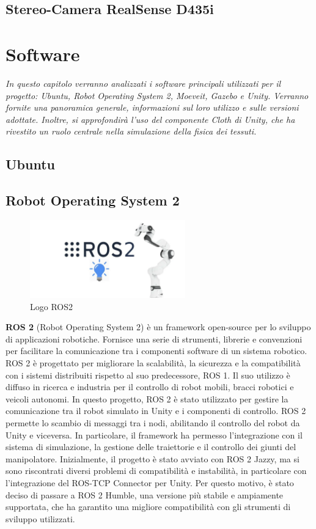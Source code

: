 \documentclass[11pt]{report}
\begin{document}
\subsection{Stereo-Camera RealSense D435i}

\section{Software}
\textit{In questo capitolo verranno analizzati i software principali utilizzati per il progetto: Ubuntu, Robot Operating System 2, Moeveit, Gazebo e Unity. Verranno fornite una panoramica generale, informazioni sul loro utilizzo e sulle versioni adottate. Inoltre, si approfondirà l'uso del componente Cloth di Unity, che ha rivestito un ruolo centrale nella simulazione della fisica dei tessuti.}

\subsection{Ubuntu}

\subsection{Robot Operating System 2}

\begin{figure}[H]
    \centering
    \includegraphics[width=0.6\textwidth]{images/ROS2.png}
    \caption{Logo ROS2}
    \label{fig:ROS2}
\end{figure}

\textbf{ROS 2} (Robot Operating System 2) \cite{ROS2} è un framework open-source per lo sviluppo di applicazioni robotiche. Fornisce una serie di strumenti, librerie e convenzioni per facilitare la comunicazione tra i componenti software di un sistema robotico. ROS 2 è progettato per migliorare la scalabilità, la sicurezza e la compatibilità con i sistemi distribuiti rispetto al suo predecessore, ROS 1. Il suo utilizzo è diffuso in ricerca e industria per il controllo di robot mobili, bracci robotici e veicoli autonomi.
In questo progetto, ROS 2 è stato utilizzato per gestire la comunicazione tra il robot simulato in Unity e i componenti di controllo. ROS 2 permette lo scambio di messaggi tra i nodi, abilitando il controllo del robot da Unity e viceversa. In particolare, il framework ha permesso l'integrazione con il sistema di simulazione, la gestione delle traiettorie e il controllo dei giunti del manipolatore.
Inizialmente, il progetto è stato avviato con ROS 2 Jazzy, ma si sono riscontrati diversi problemi di compatibilità e instabilità, in particolare con l'integrazione del ROS-TCP Connector per Unity. Per questo motivo, è stato deciso di passare a ROS 2 Humble, una versione più stabile e ampiamente supportata, che ha garantito una migliore compatibilità con gli strumenti di sviluppo utilizzati.
\end{document}
